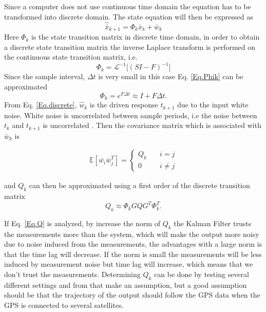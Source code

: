 Since a computer does not use continuous time domain the equation has to be transformed into discrete domain. The state equation will then be expressed as
\begin{equation}
\hat{\bar{x}}_{k+1} = \Phi_k \bar{x}_k +  \bar{w}_k	
\label{Eq.discrete}
\end{equation}
Here $\Phi_k$ is the state transition matrix in discrete time domain, in order to obtain a discrete state transition matrix the inverse Laplace transform is performed on the continuous state transition matrix, i.e.
\begin{equation}
\Phi_k = \mathcal{L}^{-1}\big[(SI-F)^{-1}\big]
\label{Eq.Phik}
\end{equation}
Since the sample interval, $\Delta t$ is very small in this case Eq. \eqref{Eq.Phik} can be approximated 
\begin{equation}
\Phi_k = e^{F\Delta t} \approx I + F \Delta t 
\label{Eq.Final_Phik}.
\end{equation}
From Eq. \eqref{Eq.discrete}, $\hat{w}_k$ is the driven response $t_{k+1}$ due to the input white noise. White noise is uncorrelated between sample periods, i.e the noise between $t_k$ and $t_{k+1}$ is uncorrelated \cite{signal_process}. Then the covariance matrix which is associated with $\bar{w}_k$ is \cite{signal_process}

\begin{align}
\mathbb{E}[\bar{w_i}\bar{w}_j^T] =
\begin{cases}
  Q_k &\quad i=j\\    
  0 &\quad i\neq j   
\end{cases}
\end{align}

and $Q_k$ can then be approximated using a first order of the discrete transition matrix \cite{Discrete_kalman}
\begin{equation}
Q_k\approx \Phi_k GQG^T \Phi_k^T.
\label{Eq.Q_k}
\end{equation}

If Eq. \eqref{Eq.Q} is analyzed, by increase the norm of $Q_k$ the Kalman Filter trusts the measurements more than the system, which will make the output more noisy due to noise induced from the measurements, the advantages with a large norm is that the time lag will decrease. If the norm is small the measurements will be less induced by measurement noise but time lag will increase, which means that we don't trust the measurements. Determining $Q_k$ can be done by testing several different settings and from that make an assumption, but a good assumption should be that the trajectory of the output should follow the GPS data when the GPS is connected to several satellites.\\



